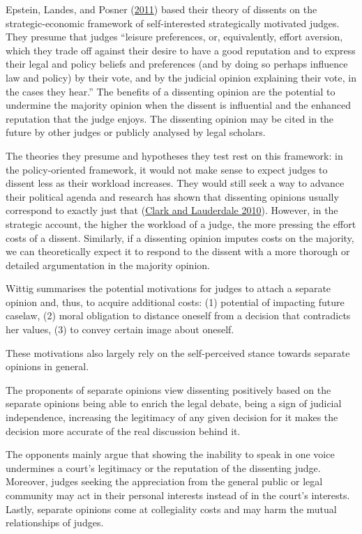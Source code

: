 \documentclass[
  11pt,
]{article}
\begin{document}
Epstein, Landes, and Posner
(\protect\hyperlink{ref-epsteinWhyWhenJudges2011}{2011}) based their
theory of dissents on the strategic-economic framework of
self-interested strategically motivated judges. They presume that judges
``leisure preferences, or, equivalently, effort aversion, which they
trade off against their desire to have a good reputation and to express
their legal and policy beliefs and preferences (and by doing so perhaps
influence law and policy) by their vote, and by the judicial opinion
explaining their vote, in the cases they hear.'' The benefits of a
dissenting opinion are the potential to undermine the majority opinion
when the dissent is influential and the enhanced reputation that the
judge enjoys. The dissenting opinion may be cited in the future by other
judges or publicly analysed by legal scholars.

The theories they presume and hypotheses they test rest on this
framework: in the policy-oriented framework, it would not make sense to
expect judges to dissent less as their workload increases. They would
still seek a way to advance their political agenda and research has
shown that dissenting opinions usually correspond to exactly just that
(\protect\hyperlink{ref-clarkLocatingSupremeCourt2010}{Clark and
Lauderdale 2010}). However, in the strategic account, the higher the
workload of a judge, the more pressing the effort costs of a dissent.
Similarly, if a dissenting opinion imputes costs on the majority, we can
theoretically expect it to respond to the dissent with a more thorough
or detailed argumentation in the majority opinion.

Wittig summarises the potential motivations for judges to attach a
separate opinion and, thus, to acquire additional costs: (1) potential
of impacting future caselaw, (2) moral obligation to distance oneself
from a decision that contradicts her values, (3) to convey certain image
about oneself.

These motivations also largely rely on the self-perceived stance towards
separate opinions in general.

The proponents of separate opinions view dissenting positively based on
the separate opinions being able to enrich the legal debate, being a
sign of judicial independence, increasing the legitimacy of any given
decision for it makes the decision more accurate of the real discussion
behind it.

The opponents mainly argue that showing the inability to speak in one
voice undermines a court's legitimacy or the reputation of the
dissenting judge. Moreover, judges seeking the appreciation from the
general public or legal community may act in their personal interests
instead of in the court's interests. Lastly, separate opinions come at
collegiality costs and may harm the mutual relationships of judges.
\end{document}
